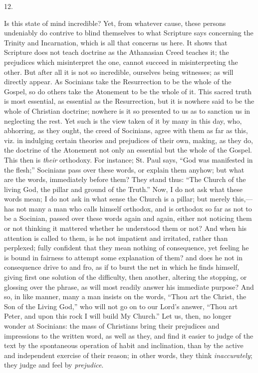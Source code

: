 12.

Is this state of mind incredible? Yet, from whatever cause, these
persons undeniably do contrive to blind themselves to what Scripture
says concerning the Trinity and Incarnation, which is all that
concerns us here. It shows that Scripture does not teach doctrine as
the Athanasian Creed teaches it; the prejudices which misinterpret the
one, cannot succeed in misinterpreting the other. But after all it is
not so incredible, ourselves being witnesses; as will directly appear.
As Socinians take the Resurrection to be the whole of the Gospel, so
do others take the Atonement to be the whole of it. This sacred truth
is most essential, as essential as the Resurrection, but it is nowhere
said to be the whole of Christian doctrine; nowhere is it so presented
to us as to sanction us in neglecting the rest. Yet such is the view
taken of it by many in this day, who, abhorring, as they ought, the
creed of Socinians, agree with them as far as this, viz. in indulging
certain theories and prejudices of their own, making, as they do, the
doctrine of the Atonement not only an essential but the whole of the
Gospel. This then is \emph{their} orthodoxy. For instance; St.
Paul says, ``God was manifested in the flesh;'' Socinians pass
over these words, or explain them anyhow; but what are the words,
immediately before them? They stand thus: ``The Church of the
living God, the pillar and ground of the Truth.'' Now, I do not
ask what these words mean; I do not ask in what sense the Church is a
pillar; but merely this,—has not many a man who calls himself
orthodox, and is orthodox so far as not to be a Socinian, passed over
these words again and again, either not noticing them or not thinking
it mattered whether he understood them or not? And when his attention
is called to them, is he not impatient and irritated, rather than
perplexed; fully confident that they mean nothing of consequence, yet
feeling he is bound in fairness to attempt some explanation of them?
and does he not in consequence drive to and fro, as if to burst the
net in which he finds himself, giving first one solution of the
difficulty, then another, altering the stopping, or glossing over the
phrase, as will most readily answer his immediate purpose? And so, in
like manner, many a man insists on the words, ``Thou art the
Christ, the Son of the Living God,'' who will not go on to our
Lord's answer, ``Thou art Peter, and upon this rock I will build
My Church.'' Let us, then, no longer wonder at Socinians: the mass
of Christians bring their prejudices and impressions to the written
word, as well as they, and find it easier to judge of the text by the
spontaneous operation of habit and inclination, than by the active and
independent exercise of their reason; in other words, they think \emph{inaccurately};
they judge and feel by \emph{prejudice}.

